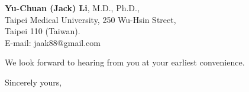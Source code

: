 \documentclass[11pt]{letter} %
\begin{document}
\begin{letter}{\textbf{Yu-Chuan (Jack) Li}, M.D., Ph.D., \\
Taipei Medical University, 250 Wu-Hsin Street, \\ 
Taipei 110 (Taiwan). \\ 
E-mail: jaak88@gmail.com
}
\begin{center}
\end{center}

We look forward to hearing from you at your earliest convenience.

\closing{Sincerely yours,}
\vfill



\end{letter}
\end{document}
